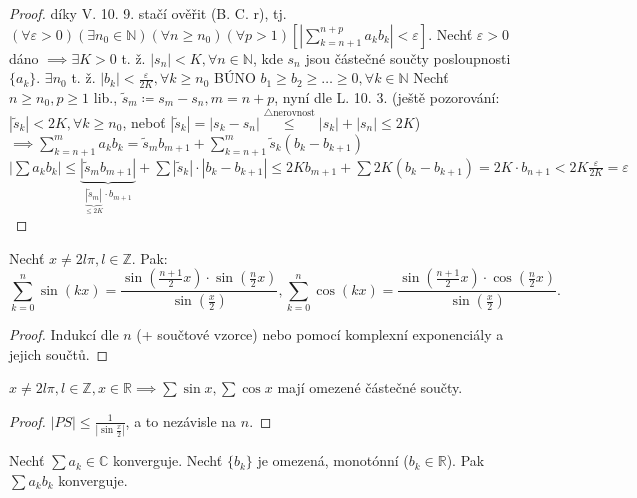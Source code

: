 \begin{proof}
    díky V. 10. 9. stačí ověřit (B. C. r), tj. $(\forall \varepsilon >0)(\exists n_0 \in \mathbb N)(\forall n \geq n_0)(\forall p >1)[|\sum_{k=n+1}^{n+p}a_k b_k|<\varepsilon]$. Nechť $\varepsilon>0$ dáno $\implies \exists K > 0$ t. ž. $|s_n|<K, \forall n \in \mathbb N$, kde $s_n$ jsou částečné součty posloupnosti $\{a_k\}$.
    $\exists n_0$ t. ž. $|b_k|<\frac{\varepsilon}{2K}, \forall k \geq n_0$
    BÚNO $b_1\geq b_2 \geq \dots \geq 0, \forall k \in \mathbb N$
    Nechť $n\geq n_0, p \geq 1$ lib., $\tilde{s}_m \coloneq s_m -s_n, m = n+p$, nyní dle L. 10. 3.
    (ještě pozorování: $|\tilde{s}_k|< 2K, \forall k \geq n_0$, neboť $|\tilde{s}_k| = |s_k-s_n| \stackrel{\triangle \text{nerovnost}}{\leq}|s_k|+|s_n|\leq 2K$)
    $\implies\sum_{k=n+1}^{m}a_kb_k = \tilde{s}_mb_{m+1}+\sum_{k=n+1}^{m} \tilde{s}_k(b_k-b_{k+1})$
    $|\sum a_kb_k| \leq \underbrace{|\tilde{s}_mb_{m+1}|}_{\underbrace{|\tilde{s}_m|}_{\leq 2K}\cdot b_{m+1}}+\sum|\tilde{s}_k|\cdot|b_k-b_{k+1}|\leq 2Kb_{m+1}+\sum 2K(b_k-b_{k+1})=2K\cdot b_{n+1}<2K \frac{\varepsilon}{2K} = \varepsilon$
\end{proof}

\begin{lemma}
    Nechť $x \neq 2l \pi, l \in \mathbb Z$. Pak: $$\sum_{k=0}^{n} \sin(kx) = \frac{\sin\left(\frac{n+1}{2}x\right)\cdot\sin\left(\frac{n}{2}x\right)}{\sin\left(\frac{x}{2}\right)},\sum_{k=0}^{n} \cos(kx) = \frac{\sin\left(\frac{n+1}{2}x\right)\cdot\cos\left(\frac{n}{2}x\right)}{\sin\left(\frac{x}{2}\right)}.$$
\end{lemma}

\begin{proof}
    Indukcí dle $n$ (+ součtové vzorce) nebo pomocí komplexní exponenciály a jejich součtů.
\end{proof}

\begin{dusledek}
    $x \neq 2l\pi, l \in \mathbb Z, x \in \mathbb R\implies\sum \sin x, \sum \cos x$ mají omezené částečné součty.
\end{dusledek}

\begin{proof}
    $|PS| \leq \frac{1}{|\sin \frac{x}{2}|}$, a to nezávisle na $n$.
\end{proof}

\begin{veta}
    Nechť $\sum a_k \in \mathbb C$ konverguje. Nechť $\{b_k\}$ je omezená, monotónní ($b_k \in \mathbb R$). Pak $\sum a_kb_k$ konverguje.
\end{veta}

